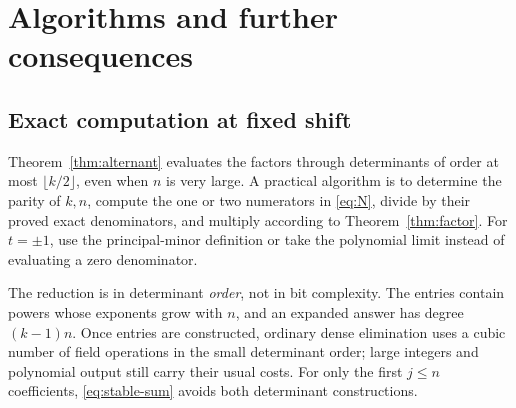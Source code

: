 \documentclass[11pt]{article}
\theoremstyle{definition}
\theoremstyle{remark}
\numberwithin{equation}{section}
\begin{document}
\section{Algorithms and further consequences}
\label{sec:consequences}

\subsection{Exact computation at fixed shift}
Theorem~\ref{thm:alternant} evaluates the factors through determinants of
order at most $\lfloor k/2\rfloor$, even when $n$ is very large.
A practical algorithm is to determine the parity of $k,n$, compute the
one or two numerators in \eqref{eq:N}, divide by their proved exact
denominators, and multiply according to Theorem~\ref{thm:factor}.
For $t=\pm1$, use the principal-minor definition or take the polynomial
limit instead of evaluating a zero denominator.

The reduction is in determinant \emph{order}, not in bit complexity.
The entries contain powers whose exponents grow with $n$, and an expanded
answer has degree $(k-1)n$. Once entries are constructed, ordinary dense
elimination uses a cubic number of field operations in the small determinant
order; large integers and polynomial output still carry their usual costs.
For only the first $j\le n$ coefficients, \eqref{eq:stable-sum} avoids
both determinant constructions.
\end{document}
